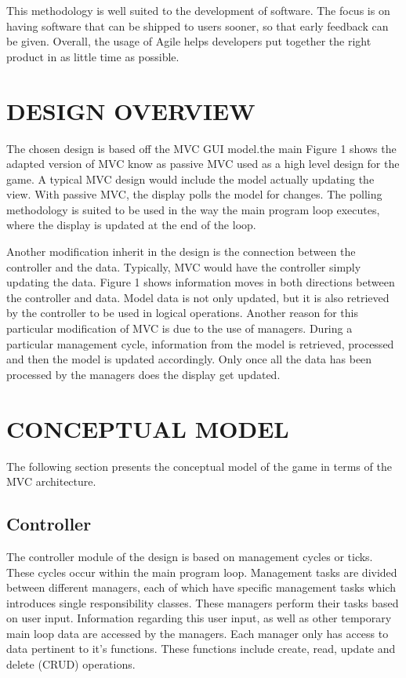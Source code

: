 \documentclass[10pt,twocolumn]{witseiepaper}
\begin{document}
This methodology is well suited to the development of software. The focus is on having software that can be shipped to users sooner, so that early feedback can be given. Overall, the usage of Agile helps developers put together the right product in as little time as possible.

%
\section{DESIGN OVERVIEW} %
The chosen design is based off the MVC GUI model.the main Figure 1 shows the adapted version of MVC know as passive MVC used as a high level design for the game. A typical MVC design would include the model actually updating the view. With passive MVC, the display polls the model for changes. The polling methodology is suited to be used in the way the main program loop executes, where the display is updated at the end of the loop. 

Another modification inherit in the design is the connection between the controller and the data. Typically, MVC would have the controller simply updating the data. Figure 1 shows information moves in both directions between the controller and data. Model data is not only updated, but it is also retrieved by the controller to be used in logical operations. Another reason for this particular modification of MVC is due to the use of managers. During a particular management cycle, information from the model is retrieved, processed and then the model is updated accordingly. Only once all the data has been processed by the managers does the display get updated.  



%
\section{CONCEPTUAL MODEL} %

The following section presents the conceptual model of the game in terms of the MVC architecture.

\subsection{Controller}
The controller module of the design is based on management cycles or ticks. These cycles occur within the main program loop. Management tasks are divided between different managers, each of which have specific management tasks which introduces single responsibility classes. These managers perform their tasks based on user input. Information regarding this user input, as well as other temporary main loop data are accessed by the managers. Each manager only has access to data pertinent to it's functions. These functions include create, read, update and delete (CRUD) operations.
\end{document}
